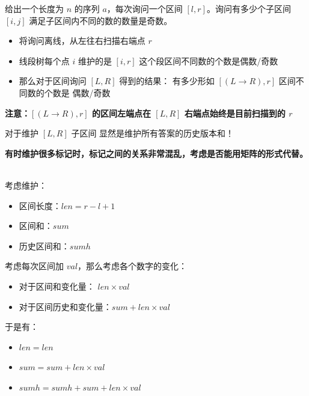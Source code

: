 \begin{tcolorbox}
\par \noindent 给出一个长度为 $n$ 的序列 $a$，每次询问一个区间 $[l,r]$。询问有多少个子区间 $[i,j]$ 满足子区间内不同的数的数量是奇数。
\end{tcolorbox}
\begin{itemize}
\item 将询问离线，从左往右扫描右端点 $r$
\item 线段树每个点 $i$ 维护的是 $[i,r]$ 这个段区间不同数的个数是偶数/奇数
\item 那么对于区间询问 $[L, R]$ 得到的结果： 有多少形如 $[(L\to R), r]$ 区间不同数的个数是 偶数/奇数
\end{itemize}
\textbf{注意：$[(L\to R), r]$ 的区间左端点在 $[L,R]$ 右端点始终是目前扫描到的 $r$ }
~\\
\par \noindent 对于维护 $[L,R]$ 子区间 显然是维护所有答案的历史版本和！
~\\

\par \noindent \textbf{有时维护很多标记时，标记之间的关系非常混乱，考虑是否能用矩阵的形式代替。}
~\\
\par \noindent 考虑维护：

\begin{itemize}
\item 区间长度：$len=r-l+1$
\item 区间和：$sum$
\item 历史区间和：$sumh$
\end{itemize}

\par \noindent 考虑每次区间加 $val$，那么考虑各个数字的变化：

\begin{itemize}
\item 对于区间和变化量： $len×val$
\item 对于区间历史和变化量：$sum+len×val$
\end{itemize}

\par \noindent 于是有：

\begin{itemize}
\item $len = len$
\item $sum = sum + len × val$
\item $sumh = sumh + sum + len × val$
\end{itemize}

